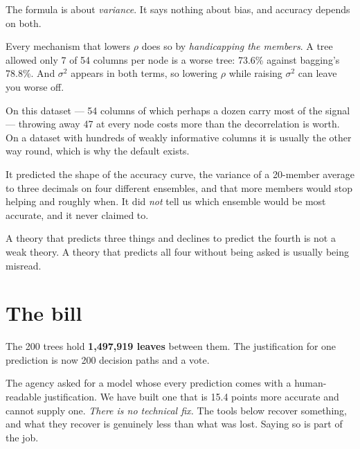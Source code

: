 \documentclass[11pt,a4paper]{article}
\begin{document}
\begin{failbox}[title={That is not a contradiction --- read the formula again}]
The formula is about \emph{variance}. It says nothing about bias, and accuracy
depends on both.

Every mechanism that lowers $\rho$ does so by \emph{handicapping the members}.
A tree allowed only 7 of 54 columns per node is a worse tree: 73.6\% against
bagging's 78.8\%. And $\sigma^2$ appears in both terms, so lowering $\rho$
while raising $\sigma^2$ can leave you worse off.

On this dataset --- 54 columns of which perhaps a dozen carry most of the
signal --- throwing away 47 at every node costs more than the decorrelation is
worth. On a dataset with hundreds of weakly informative columns it is usually
the other way round, which is why the default exists.
\end{failbox}

\begin{keybox}[title={What the derivation predicted, and what it declined to}]
It predicted the shape of the accuracy curve, the variance of a 20-member
average to three decimals on four different ensembles, and that more members
would stop helping and roughly when. It did \emph{not} tell us which ensemble
would be most accurate, and it never claimed to.

A theory that predicts three things and declines to predict the fourth is not a
weak theory. A theory that predicts all four without being asked is usually
being misread.
\end{keybox}

\section{The bill}

\begin{failbox}[title={Failure condition --- an ensemble has no per-prediction justification}]
The 200 trees hold \textbf{1{,}497{,}919 leaves} between them. The
justification for one prediction is now 200 decision paths and a vote.

The agency asked for a model whose every prediction comes with a human-readable
justification. We have built one that is 15.4 points more accurate and cannot
supply one. \emph{There is no technical fix.} The tools below recover
something, and what they recover is genuinely less than what was lost. Saying
so is part of the job.
\end{failbox}
\end{document}
